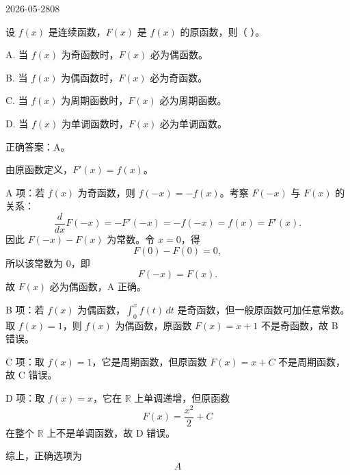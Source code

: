 \begin{mistake}{2026-05-28}{08}

\begin{problemcontent}
设 \(f(x)\) 是连续函数，\(F(x)\) 是 \(f(x)\) 的原函数，则（ ）。

A. 当 \(f(x)\) 为奇函数时，\(F(x)\) 必为偶函数。

B. 当 \(f(x)\) 为偶函数时，\(F(x)\) 必为奇函数。

C. 当 \(f(x)\) 为周期函数时，\(F(x)\) 必为周期函数。

D. 当 \(f(x)\) 为单调函数时，\(F(x)\) 必为单调函数。
\end{problemcontent}

\begin{solutioncontent}
正确答案：A。

由原函数定义，\(F'(x)=f(x)\)。

A 项：若 \(f(x)\) 为奇函数，则 \(f(-x)=-f(x)\)。考察 \(F(-x)\) 与 \(F(x)\) 的关系：
\[
\frac{d}{dx}F(-x)=-F'(-x)=-f(-x)=f(x)=F'(x).
\]
因此 \(F(-x)-F(x)\) 为常数。令 \(x=0\)，得
\[
F(0)-F(0)=0,
\]
所以该常数为 \(0\)，即
\[
F(-x)=F(x).
\]
故 \(F(x)\) 必为偶函数，A 正确。

B 项：若 \(f(x)\) 为偶函数，\(\int_0^x f(t)\,dt\) 是奇函数，但一般原函数可加任意常数。取 \(f(x)=1\)，则 \(f(x)\) 为偶函数，原函数 \(F(x)=x+1\) 不是奇函数，故 B 错误。

C 项：取 \(f(x)=1\)，它是周期函数，但原函数 \(F(x)=x+C\) 不是周期函数，故 C 错误。

D 项：取 \(f(x)=x\)，它在 \(\mathbb{R}\) 上单调递增，但原函数
\[
F(x)=\frac{x^2}{2}+C
\]
在整个 \(\mathbb{R}\) 上不是单调函数，故 D 错误。

综上，正确选项为
\[
\boxed{A}
\]
\end{solutioncontent}


\end{mistake}
